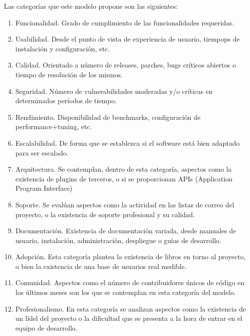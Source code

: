 \documentclass[11pt]{article}
\begin{document}
\begin{itemize}
Las categorías que este modelo propone son las siguientes:
\begin{enumerate}
\item{Funcionalidad}. Grado de cumplimiento de las funcionalidades requeridas.
\item{Usabilidad}. Desde el punto de vista de experiencia de usuario, tiempops de instalación y configuración, etc.
\item{Calidad}. Orientado a número de releases, parches, bugs críticos abiertos o tiempo de resolución de los mismos.
\item{Seguridad}. Número de vulnerabilidades moderadas y/o críticas en determinados períodos de tiempo.
\item{Rendimiento}. Disponibilidad de benchmarks, configuración de performance+tuning, etc.
\item{Escalabilidad}. De forma que se establezca si el software está bien adaptado para ser escalado.
\item{Arquitectura}. Se contemplan, dentro de esta categoría, aspectos como la existencia de plugins de terceros, o si se proporcionan APIs (Application Program Interface)
\item{Soporte}. Se evalúan aspectos como la actividad en las listas de correo del proyecto, o la existencia de soporte profesional y su calidad.
\item{Documentación}. Existencia de documentación variada, desde manuales de usuario, instalación, administración, despliegue o guías de desarrollo.
\item{Adopción}. Esta categoría plantea la existencia de libros en torno al proyecto, o bien la existencia de una base de usuarios real medible.
\item{Comunidad}. Aspectos como el número de contribuidores únicos de código en los últimos meses son los que se contemplan en esta categoría del modelo.
\item{Profesionalismo}. En esta categoría se analizan aspectos como la existencia de un lídel del proyecto o la dificultad que se presenta a la hora de entrar en el equipo de desarrollo.
\end{enumerate}


\end{itemize}
\end{document}
